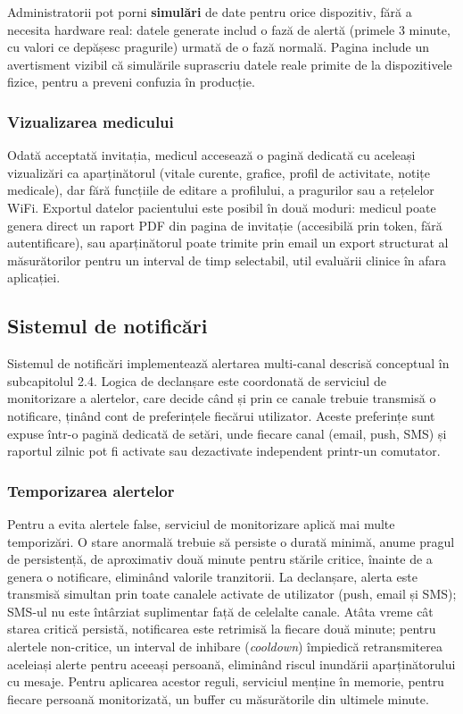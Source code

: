 \documentclass[12pt,a4paper,twoside]{article}
\begin{document}
Administratorii pot porni \textbf{simulări} de date pentru orice dispozitiv, fără a necesita hardware real: datele generate includ o fază de alertă (primele 3 minute, cu valori ce depășesc pragurile) urmată de o fază normală. Pagina include un avertisment vizibil că simulările suprascriu datele reale primite de la dispozitivele fizice, pentru a preveni confuzia în producție.

\subsubsection{Vizualizarea medicului}

Odată acceptată invitația, medicul accesează o pagină dedicată cu aceleași vizualizări ca aparținătorul (vitale curente, grafice, profil de activitate, notițe medicale), dar fără funcțiile de editare a profilului, a pragurilor sau a rețelelor WiFi. Exportul datelor pacientului este posibil în două moduri: medicul poate genera direct un raport PDF din pagina de invitație (accesibilă prin token, fără autentificare), sau aparținătorul poate trimite prin email un export structurat al măsurătorilor pentru un interval de timp selectabil, util evaluării clinice în afara aplicației.

\subsection{Sistemul de notificări}

Sistemul de notificări implementează alertarea multi-canal descrisă conceptual în subcapitolul 2.4. Logica de declanșare este coordonată de serviciul de monitorizare a alertelor, care decide când și prin ce canale trebuie transmisă o notificare, ținând cont de preferințele fiecărui utilizator. Aceste preferințe sunt expuse într-o pagină dedicată de setări, unde fiecare canal (email, push, SMS) și raportul zilnic pot fi activate sau dezactivate independent printr-un comutator.

\subsubsection{Temporizarea alertelor}

Pentru a evita alertele false, serviciul de monitorizare aplică mai multe temporizări. O stare anormală trebuie să persiste o durată minimă, anume pragul de persistență, de aproximativ două minute pentru stările critice, înainte de a genera o notificare, eliminând valorile tranzitorii. La declanșare, alerta este transmisă simultan prin toate canalele activate de utilizator (push, email și SMS); SMS-ul nu este întârziat suplimentar față de celelalte canale. Atâta vreme cât starea critică persistă, notificarea este retrimisă la fiecare două minute; pentru alertele non-critice, un interval de inhibare (\textit{cooldown}) împiedică retransmiterea aceleiași alerte pentru aceeași persoană, eliminând riscul inundării aparținătorului cu mesaje. Pentru aplicarea acestor reguli, serviciul menține în memorie, pentru fiecare persoană monitorizată, un buffer cu măsurătorile din ultimele minute.
\end{document}
